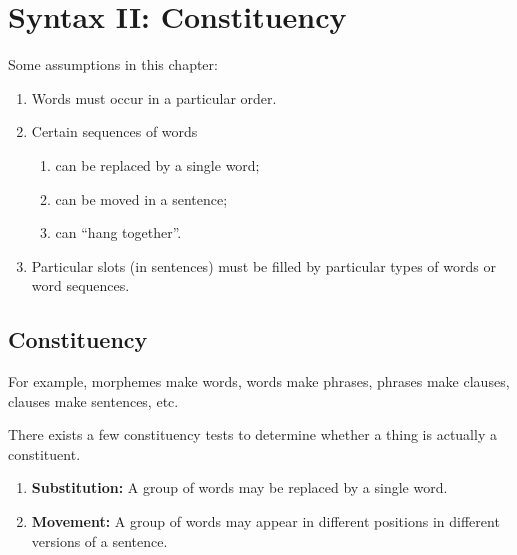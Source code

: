 \documentclass[../main.tex]{subfiles}
\begin{document}
	\chapter{Syntax II: Constituency}
		\begin{preamb}
			Some assumptions in this chapter: \begin{enumerate}
				\item Words must occur in a particular order.
				\item Certain sequences of words \begin{enumerate}
					\item can be replaced by a single word;
					\item can be moved in a sentence;
					\item can ``hang together''.
				\end{enumerate}
				\item Particular slots (in sentences) must be filled by particular types of words or word sequences.
			\end{enumerate}
		\end{preamb}
		\section{Constituency}
		For example, morphemes make words, words make phrases, phrases make clauses, clauses make sentences, etc.

		There exists a few constituency tests to determine whether a thing is actually a constituent.
		\begin{enumerate}
			\item \textbf{Substitution:} A group of words may be replaced by a single word.
			\item \textbf{Movement:} A group of words may appear in different positions in different versions of a sentence.
		\end{enumerate}
\end{document}
